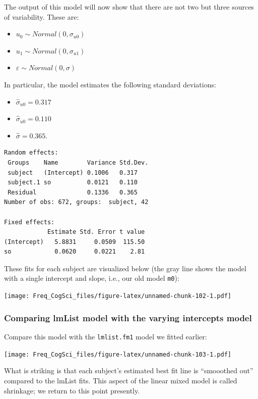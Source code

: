 \documentclass[12pt,]{krantz}
\providecommand{\tightlist}{%
  \setlength{\itemsep}{0pt}\setlength{\parskip}{0pt}}
\begin{document}
The output of this model will now show that there are not two but three sources of variability. These are:

\begin{itemize}
\tightlist
\item
  \(u_0 \sim Normal(0,\sigma_{u0})\)
\item
  \(u_1 \sim Normal(0,\sigma_{u1})\)
\item
  \(\varepsilon \sim Normal(0,\sigma)\)
\end{itemize}

In particular, the model estimates the following standard deviations:

\begin{itemize}
\tightlist
\item
  \(\hat\sigma_{u0}=0.317\)
\item
  \(\hat\sigma_{u0}=0.110\)
\item
  \(\hat\sigma = 0.365\).
\end{itemize}

\begin{verbatim}
Random effects:
 Groups    Name        Variance Std.Dev.
 subject   (Intercept) 0.1006   0.317   
 subject.1 so          0.0121   0.110   
 Residual              0.1336   0.365   
Number of obs: 672, groups:  subject, 42

Fixed effects:
            Estimate Std. Error t value
(Intercept)   5.8831     0.0509  115.50
so            0.0620     0.0221    2.81
\end{verbatim}

These fits for each subject are visualized below (the gray line shows the model with a single intercept and slope, i.e., our old model \texttt{m0}):

\texttt{[image: Freq\_CogSci\_files/figure-latex/unnamed-chunk-102-1.pdf]}

\hypertarget{comparing-lmlist-model-with-the-varying-intercepts-model}{%
\subsubsection{Comparing lmList model with the varying intercepts model}\label{comparing-lmlist-model-with-the-varying-intercepts-model}}

Compare this model with the \texttt{lmlist.fm1} model we fitted earlier:

\texttt{[image: Freq\_CogSci\_files/figure-latex/unnamed-chunk-103-1.pdf]}

What is striking is that each subject's estimated best fit line is ``smooothed out'' compared to the lmList fits. This aspect of the linear mixed model is called shrinkage; we return to this point presently.
\end{document}
